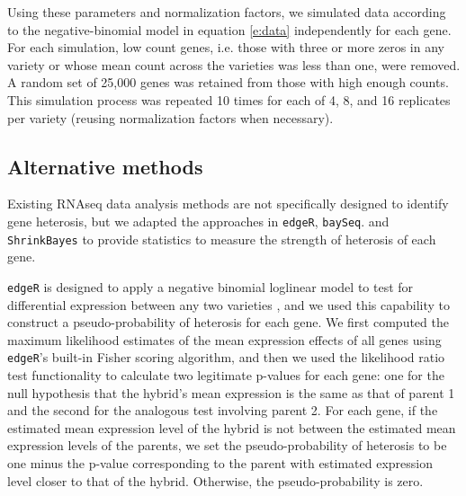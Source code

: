 \documentclass[useAMS,usenatbib,referee]{biom}
\begin{document}
Using these parameters and normalization factors, we simulated data according to the negative-binomial model in equation \eqref{e:data} independently for each gene. For each simulation, low count genes, i.e. those with three or more zeros in any variety or whose mean count across the varieties was less than one, were removed. A random set of 25,000 genes was retained from those with high enough counts. This simulation process was repeated 10 times for each of 4, 8, and 16 replicates per variety (reusing normalization factors when necessary).

\subsection{Alternative methods}
\label{s:alternative}

Existing RNAseq data analysis methods are not specifically designed to identify gene heterosis, but we adapted the approaches in {\tt edgeR}, {\tt baySeq}. and {\tt ShrinkBayes} to provide statistics to measure the strength of heterosis of each gene.



{\tt edgeR} is designed to apply a negative binomial loglinear model to test for differential expression between any two varieties \citep{robinson2007moderated, robinson2010edgeR}, and we used this capability to construct a pseudo-probability of heterosis for each gene. We first computed the maximum likelihood estimates of the mean expression effects of all genes using {\tt edgeR}'s built-in Fisher scoring algorithm, and then we used the likelihood ratio test functionality to calculate two legitimate p-values for each gene: one for the null hypothesis that the hybrid's mean expression is the same as that of parent 1 and the second for the analogous test involving parent 2. For each gene, if the estimated mean expression level of the hybrid is not between the estimated mean expression levels of the parents, we set the pseudo-probability of heterosis to be one minus the p-value corresponding to the parent with estimated expression level closer to that of the hybrid. Otherwise, the pseudo-probability is zero.


\end{document}

